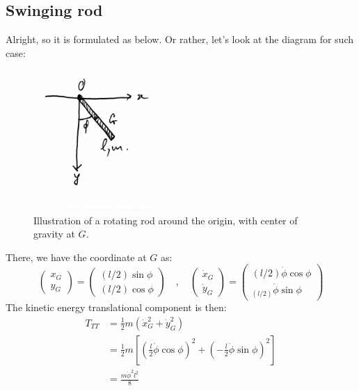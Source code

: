 \subsection{Swinging rod}
Alright, so it is formulated as below. Or rather, let's look at the diagram for such case: 
\begin{figure}[htb]
    \centering
    \includegraphics[width=0.4\textwidth]{img/c5_rod.jpg}
    \caption{Illustration of a rotating rod around the origin, with center of gravity at $G$.}
\end{figure}
There, we have the coordinate at $G$ as: 
\begin{equation}
    \begin{pmatrix}
        x_{G}\\
        y_{G}
    \end{pmatrix}
    = 
    \begin{pmatrix}
        (l/2)\sin{\phi}\\
        (l/2)\cos{\phi}
    \end{pmatrix} \quad ,\quad 
    \begin{pmatrix}
        \dot{x}_{G} \\
        \dot{y}_{G}
    \end{pmatrix}
    = 
    \begin{pmatrix}
        (l/2)\dot{\phi}\cos{\phi}\\
        _(l/2)\dot{\phi}\sin{\phi}
    \end{pmatrix}
\end{equation}
The kinetic energy translational component is then: 
\begin{equation}
    \begin{split}
        T_{TT} 
        & = \frac{1}{2}m (\dot{x}_{G}^{2}+\dot{y}_{G}^{2})\\
        & = \frac{1}{2}m \left[ \left( \frac{l}{2}\dot{\phi}\cos{\phi} \right)^{2} + \left(- \frac{l}{2}\dot{\phi}\sin{\phi} \right)^{2} \right]\\
        & = \frac{m\dot{\phi}^{2}l^{2}}{8}
    \end{split}
\end{equation}
